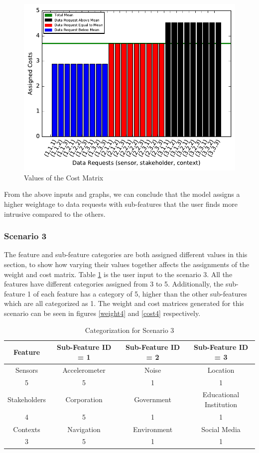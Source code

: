 \begin{figure}[ht!]
\centering
\includegraphics[width=\textwidth,keepaspectratio]{./images/cost_3}
\caption{Values of the Cost Matrix \label{cost3}}
\end{figure}


From the above inputs and graphs, we can conclude that the model assigns a higher weightage to data requests with sub-features that the user finds more intrusive compared to the others.

\subsubsection{Scenario 3}
The feature and sub-feature categories are both assigned different values in this section, to show how varying their values together affects the assignments of the weight and cost matrix. Table \ref{tab:scenario4} is the user input to the scenario 3. All the features have different categories assigned from 3 to 5. Additionally, the sub-feature 1 of each feature has a category of 5, higher than the other sub-features which are all categorized as 1. The weight and cost matrices generated for this scenario can be seen in figures \ref{weight4} and \ref{cost4} respectively. 

\begin{table}[h!]
  \centering
  \caption{Categorization for Scenario 3}
  \label{tab:scenario4}
  \begin{tabular}{cccc}
    \toprule
    Feature & Sub-Feature ID = 1 & Sub-Feature ID = 2 & Sub-Feature ID = 3\\
    \midrule
    Sensors & Accelerometer & Noise & Location\\
     5 & 5 & 1 & 1\\ \hhline{====}
     Stakeholders & Corporation & Government & Educational Institution\\
     4 & 5 & 1 & 1\\ \hhline{====}
     Contexts & Navigation & Environment & Social Media\\
     3 & 5 & 1 & 1\\ 
    \bottomrule
  \end{tabular}
\end{table}

